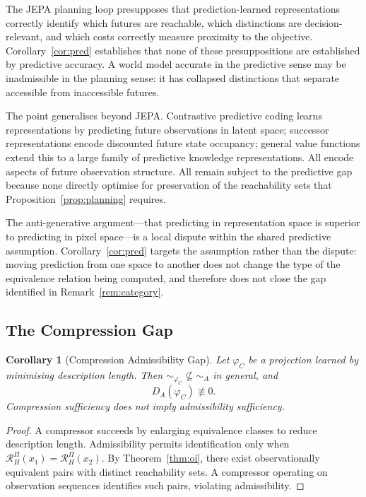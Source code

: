 \documentclass[11pt, a4paper]{article}
\theoremstyle{plain}
\newtheorem{corollary}{Corollary}
\theoremstyle{definition}
\theoremstyle{remark}
\newcommand{\simA}{\sim_A}
\newcommand{\RHP}{\mathcal{R}_H^\Pi}
\begin{document}
The JEPA planning loop presupposes that prediction-learned representations
correctly identify which futures are reachable, which distinctions are
decision-relevant, and which costs correctly measure proximity to the objective.
Corollary~\ref{cor:pred} establishes that none of these presuppositions are
established by predictive accuracy. A world model accurate in the predictive
sense may be inadmissible in the planning sense: it has collapsed distinctions
that separate accessible from inaccessible futures.

The point generalises beyond JEPA. Contrastive predictive coding
\citep{oord2018representation} learns representations by predicting future
observations in latent space; successor representations \citep{dayan1993improving}
encode discounted future state occupancy; general value functions
\citep{sutton2011horde} extend this to a large family of predictive knowledge
representations. All encode aspects of future observation structure. All remain
subject to the predictive gap because none directly optimise for preservation of
the reachability sets that Proposition~\ref{prop:planning} requires.

The anti-generative argument---that predicting in representation space is
superior to predicting in pixel space---is a local dispute within the shared
predictive assumption. Corollary~\ref{cor:pred} targets the assumption rather
than the dispute: moving prediction from one space to another does not change
the type of the equivalence relation being computed, and therefore does not close
the gap identified in Remark~\ref{rem:category}.

\subsection{The Compression Gap}

\begin{corollary}[Compression Admissibility Gap]
\label{cor:comp}
Let $\varphi_C$ be a projection learned by minimising description length.
Then ${\sim_{\varphi_C}} \not\subseteq {\simA}$ in general, and
\begin{equation}
  D_A(\varphi_C) \not\equiv 0.
\end{equation}
Compression sufficiency does not imply admissibility sufficiency.
\end{corollary}

\begin{proof}
A compressor succeeds by enlarging equivalence classes to reduce description
length. Admissibility permits identification only when $\RHP(x_1) = \RHP(x_2)$.
By Theorem~\ref{thm:oi}, there exist observationally equivalent pairs with
distinct reachability sets. A compressor operating on observation sequences
identifies such pairs, violating admissibility.
\end{proof}
\end{document}
